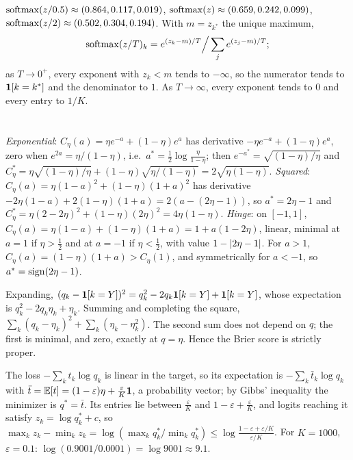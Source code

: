 $\operatorname{softmax}(z/0.5)\approx(0.864, 0.117, 0.019)$, $\operatorname{softmax}(z)\approx(0.659, 0.242, 0.099)$,
$\operatorname{softmax}(z/2)\approx(0.502, 0.304, 0.194)$. With $m = z_{k^*}$ the unique maximum,
\[
  \operatorname{softmax}(z/T)_k = e^{(z_k - m)/T}\Big/\sum_je^{(z_j - m)/T};
\]
as $T\to0^+$, every exponent with $z_k<m$ tends to $-\infty$, so the
numerator tends to $\mathbf{1}[k = k^*]$ and the denominator to $1$. As $T\to\infty$, every exponent tends to $0$
and every entry to $1/K$.

\section{}

\emph{Exponential}: $C_\eta(a) = \eta e^{-a} + (1 - \eta)e^a$ has derivative $-\eta e^{-a} + (1 - \eta)e^a$, zero when
$e^{2a} = \eta/(1 - \eta)$, i.e.\ $a^* = \frac12\log\frac\eta{1 - \eta}$; then $e^{-a^*} = \sqrt{(1 - \eta)/\eta}$ and
$C^*_\eta = \eta\sqrt{(1 - \eta)/\eta} + (1 - \eta)\sqrt{\eta/(1 - \eta)} = 2\sqrt{\eta(1 - \eta)}$.
\emph{Squared}: $C_\eta(a) = \eta(1 - a)^2 + (1 - \eta)(1 + a)^2$ has derivative $-2\eta(1 - a) + 2(1 - \eta)(1 + a) = 2(a - (2\eta - 1))$,
so $a^* = 2\eta - 1$ and $C^*_\eta = \eta(2 - 2\eta)^2 + (1 - \eta)(2\eta)^2 = 4\eta(1 - \eta)$.
\emph{Hinge}: on $[-1, 1]$, $C_\eta(a) = \eta(1 - a) + (1 - \eta)(1 + a) = 1 + a(1 - 2\eta)$, linear, minimal at $a = 1$ if $\eta>\frac12$
and at $a = -1$ if $\eta<\frac12$, with value $1 - \left|2\eta - 1\right|$. For $a>1$, $C_\eta(a) = (1 - \eta)(1 + a)>C_\eta(1)$, and
symmetrically for $a<-1$, so $a^* = \operatorname{sign}(2\eta - 1)$.

Expanding, $(q_k - \mathbf{1}[k = Y])^2 = q_k^2 - 2q_k\mathbf{1}[k = Y] + \mathbf{1}[k = Y]$, whose expectation is $q_k^2 - 2q_k\eta_k + \eta_k$.
Summing and completing the square, $\sum_k(q_k - \eta_k)^2 + \sum_k(\eta_k - \eta_k^2)$. The second sum does not depend
on $q$; the first is minimal, and zero, exactly at $q = \eta$. Hence the Brier score is
strictly proper.

The loss $-\sum_kt_k\log q_k$ is linear in the target, so its expectation is $-\sum_k\bar t_k\log q_k$ with
$\bar t = \mathbb{E}[t] = (1 - \varepsilon)\eta + \frac\varepsilon K\mathbf{1}$, a probability vector; by Gibbs' inequality the minimizer is $q^* = \bar t$.
Its entries lie between $\frac\varepsilon K$ and $1 - \varepsilon + \frac\varepsilon K$, and logits reaching it satisfy $z_k = \log q^*_k + c$, so
$\max_kz_k - \min_kz_k = \log(\max_kq^*_k/\min_kq^*_k)\leq\log\frac{1 - \varepsilon + \varepsilon/K}{\varepsilon/K}$. For $K = 1000$, $\varepsilon = 0.1$:
$\log(0.9001/0.0001) = \log9001\approx9.1$.

